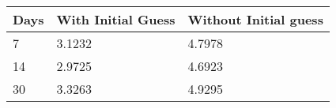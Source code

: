 \begin{tabular}{lll}
Days & With Initial Guess & Without Initial guess \\ 
\hline 
7 & 3.1232 & 4.7978 \\ 
14 & 2.9725 & 4.6923 \\ 
30 & 3.3263 & 4.9295 \\ 
\hline 
\end{tabular}